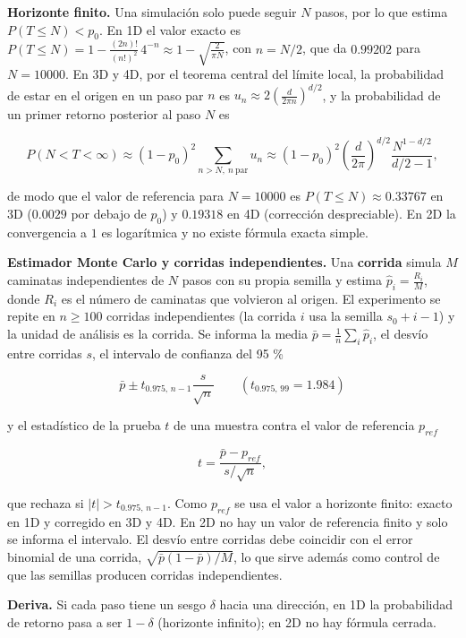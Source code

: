 \documentclass{article}
\begin{document}
\textbf{Horizonte finito.} Una simulación solo puede seguir $N$ pasos, por lo que estima $P(T\leq N)<p_0$. En 1D el valor exacto es $P(T\leq N)=1-\frac{(2n)!}{(n!)^2}\,4^{-n}\approx1-\sqrt{\frac{2}{\pi N}}$, con $n=N/2$, que da $0.99202$ para $N=10000$. En 3D y 4D, por el teorema central del límite local, la probabilidad de estar en el origen en un paso par $n$ es $u_n\approx2\left(\frac{d}{2\pi n}\right)^{d/2}$, y la probabilidad de un primer retorno posterior al paso $N$ es
\begin{center}
    $$P(N<T<\infty)\approx(1-p_0)^2\sum_{n>N,\ n\ \mathrm{par}}u_n\approx(1-p_0)^2\left(\frac{d}{2\pi}\right)^{d/2}\frac{N^{1-d/2}}{d/2-1},$$
\end{center}
de modo que el valor de referencia para $N=10000$ es $P(T\leq N)\approx0.33767$ en 3D ($0.0029$ por debajo de $p_0$) y $0.19318$ en 4D (corrección despreciable). En 2D la convergencia a $1$ es logarítmica y no existe fórmula exacta simple.

\textbf{Estimador Monte Carlo y corridas independientes.} Una \textbf{corrida} simula $M$ caminatas independientes de $N$ pasos con su propia semilla y estima $\hat p_i=\frac{R_i}{M}$, donde $R_i$ es el número de caminatas que volvieron al origen. El experimento se repite en $n\geq100$ corridas independientes (la corrida $i$ usa la semilla $s_0+i-1$) y la unidad de análisis es la corrida. Se informa la media $\bar p=\frac{1}{n}\sum_i\hat p_i$, el desvío entre corridas $s$, el intervalo de confianza del 95 \%
\begin{center}
    $$\bar p\pm t_{0.975,\,n-1}\frac{s}{\sqrt n}\qquad(t_{0.975,\,99}=1.984)$$
\end{center}
y el estadístico de la prueba $t$ de una muestra contra el valor de referencia $p_{ref}$
\begin{center}
    $$t=\frac{\bar p-p_{ref}}{s/\sqrt n},$$
\end{center}
que rechaza si $|t|>t_{0.975,\,n-1}$. Como $p_{ref}$ se usa el valor a horizonte finito: exacto en 1D y corregido en 3D y 4D. En 2D no hay un valor de referencia finito y solo se informa el intervalo. El desvío entre corridas debe coincidir con el error binomial de una corrida, $\sqrt{\bar p(1-\bar p)/M}$, lo que sirve además como control de que las semillas producen corridas independientes.

\textbf{Deriva.} Si cada paso tiene un sesgo $\delta$ hacia una dirección, en 1D la probabilidad de retorno pasa a ser $1-\delta$ (horizonte infinito); en 2D no hay fórmula cerrada.
\end{document}
